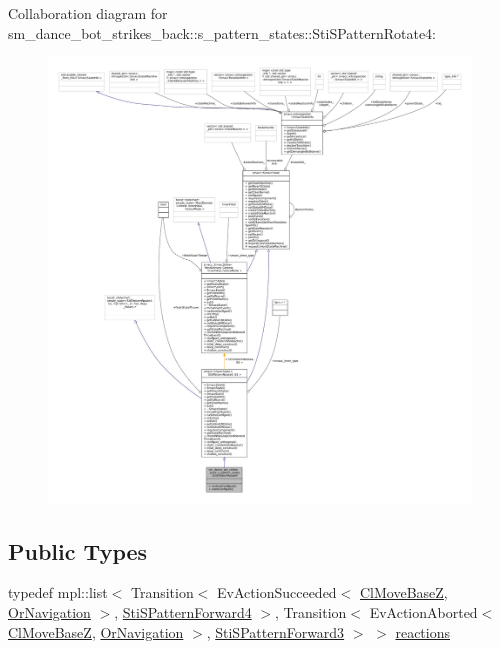 Collaboration diagram for sm\+\_\+dance\+\_\+bot\+\_\+strikes\+\_\+back\+:\+:s\+\_\+pattern\+\_\+states\+:\+:Sti\+S\+Pattern\+Rotate4\+:
\nopagebreak
\begin{figure}[H]
\begin{center}
\leavevmode
\includegraphics[width=350pt]{structsm__dance__bot__strikes__back_1_1s__pattern__states_1_1StiSPatternRotate4__coll__graph}
\end{center}
\end{figure}
\subsection*{Public Types}
\begin{DoxyCompactItemize}
\item 
typedef mpl\+::list$<$ Transition$<$ Ev\+Action\+Succeeded$<$ \hyperlink{classcl__move__base__z_1_1ClMoveBaseZ}{Cl\+Move\+BaseZ}, \hyperlink{classsm__dance__bot__strikes__back_1_1OrNavigation}{Or\+Navigation} $>$, \hyperlink{structsm__dance__bot__strikes__back_1_1s__pattern__states_1_1StiSPatternForward4}{Sti\+S\+Pattern\+Forward4} $>$, Transition$<$ Ev\+Action\+Aborted$<$ \hyperlink{classcl__move__base__z_1_1ClMoveBaseZ}{Cl\+Move\+BaseZ}, \hyperlink{classsm__dance__bot__strikes__back_1_1OrNavigation}{Or\+Navigation} $>$, \hyperlink{structsm__dance__bot__strikes__back_1_1s__pattern__states_1_1StiSPatternForward3}{Sti\+S\+Pattern\+Forward3} $>$ $>$ \hyperlink{structsm__dance__bot__strikes__back_1_1s__pattern__states_1_1StiSPatternRotate4_a8e931a92d216e81b8343aa94a6b5aa23}{reactions}
\end{DoxyCompactItemize}
